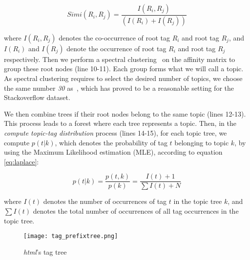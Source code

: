 \begin{equation}
Simi(R_i,R_j)= \frac{I(R_i,R_j)}{(I(R_i)+I(R_j))}
\label{eq:simi}
\end{equation}

where $I(R_i,R_j)$ denotes the co-occurrence of root tag $R_i$ and root tag $R_j$, and $I(R_i)$ and $I(R_j)$ denote the occurrence of root tag $R_i$ and root tag $R_j$ respectively. Then we perform a spectral clustering~\cite{Ng01onspectral} on the affinity matrix to group these root nodes  (line 10-11). Each group forms what we will call a topic. As spectral clustering requires to select the desired number of topics, we choose the same number \textit{30} as~\cite{Chang:2013}, which has proved to be a reasonable setting for the Stackoverflow dataset.

We then combine trees if their root nodes belong to the same topic (lines 12-13). This process leads to a forest where each tree represents a topic. Then, in the \textit{compute topic-tag distribution} process (lines 14-15), for each topic tree, we compute $p(t|k)$, which denotes the probability of tag $t$ belonging to topic $k$, by using the Maximum Likelihood estimation (MLE), according to equation \ref{eq:laplace}: 


\begin{equation}
p(t|k) = \frac{p(t,k)}{p(k)} = \frac{I(t)+1}{\sum I(t)+N}
\label{eq:laplace}
\end{equation}


where $I(t)$ denotes the number of occurrences of tag $t$ in the topic tree $k$, and $\sum I(t)$ denotes the total number of occurrences of all tag occurrences in the topic tree.

\begin{figure}[!htp]
\centering
\texttt{[image: tag\_prefixtree.png]}  
\caption{\textit{html}'s tag tree}
\label{fig:htmltagtree} 
\end{figure}


